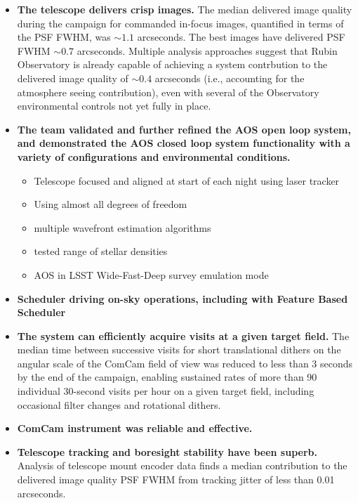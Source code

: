 \begin{itemize}
    \item \textbf{The telescope delivers crisp images.}
    The median delivered image quality during the campaign for commanded in-focus images, quantified in terms of the PSF FWHM, was $\sim1.1$ arcseconds.
    The best images have delivered PSF FWHM $\sim0.7$ arcseconds.
    Multiple analysis approaches suggest that Rubin Observatory is already capable of achieving a system contrbution to the delivered image quality of $\sim0.4$ arcseconds (i.e., accounting for the atmosphere seeing contribution), even with several of the Observatory environmental controls not yet fully in place.
    \item \textbf{The team validated and further refined the AOS open loop system, and demonstrated the AOS closed loop system functionality with a variety of configurations and environmental conditions.}
    \begin{itemize}
        \item Telescope focused and aligned at start of each night using laser tracker
        \item Using almost all degrees of freedom
        \item multiple wavefront estimation algorithms
        \item tested range of stellar densities
        \item AOS in LSST Wide-Fast-Deep survey emulation mode
    \end{itemize}
    \item \textbf{Scheduler driving on-sky operations, including with Feature Based Scheduler}
    \item \textbf{The system can efficiently acquire visits at a given target field.} The median time between successive visits for short translational dithers on the angular scale of the ComCam field of view was reduced to less than 3 seconds by the end of the campaign, enabling sustained rates of more than 90 individual 30-second visits per hour on a given target field, including occasional filter changes and rotational dithers.
    \item \textbf{ComCam instrument was reliable and effective.}
    \item \textbf{Telescope tracking and boresight stability have been superb.} Analysis of telescope mount encoder data finds a median contribution to the delivered image quality PSF FWHM from tracking jitter of less than 0.01 arcseconds.

\end{itemize}
